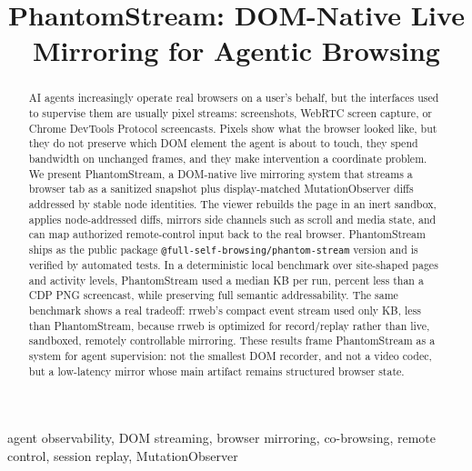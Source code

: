 \documentclass[conference]{IEEEtran}
\newcommand{\code}[1]{\texttt{\small #1}}
\begin{document}
\title{PhantomStream: DOM-Native Live Mirroring for Agentic Browsing}

\author{
}

\maketitle

\begin{abstract}
AI agents increasingly operate real browsers on a user's behalf, but the
interfaces used to supervise them are usually pixel streams: screenshots,
WebRTC screen capture, or Chrome DevTools Protocol screencasts. Pixels show what
the browser looked like, but they do not preserve which DOM element the agent is
about to touch, they spend bandwidth on unchanged frames, and they make
intervention a coordinate problem. We present PhantomStream, a DOM-native live
mirroring system that streams a browser tab as a sanitized snapshot plus
display-matched MutationObserver diffs addressed by stable node identities. The
viewer rebuilds the page in an inert sandbox, applies node-addressed diffs,
mirrors side channels such as scroll and media state, and can map authorized
remote-control input back to the real browser. PhantomStream ships as the public
package \code{@full-self-browsing/phantom-stream} version \PSPackageVersion{}
and is verified by \PSTestCount{} automated tests. In a deterministic local
benchmark over \PSCorpusCount{} site-shaped pages and \PSActivityCount{} activity
levels, PhantomStream used a median \PSPhantomMedianKB{} KB per run, \PSReductionVsCDP{}
percent less than a CDP PNG screencast, while preserving full semantic
addressability. The same benchmark shows a real tradeoff: rrweb's compact event
stream used only \PSRrwebMedianKB{} KB, less than PhantomStream, because rrweb is
optimized for record/replay rather than live, sandboxed, remotely controllable
mirroring. These results frame PhantomStream as a system for agent supervision:
not the smallest DOM recorder, and not a video codec, but a low-latency mirror
whose main artifact remains structured browser state.
\end{abstract}

\begin{IEEEkeywords}
agent observability, DOM streaming, browser mirroring, co-browsing, remote
control, session replay, MutationObserver
\end{IEEEkeywords}
\end{document}
